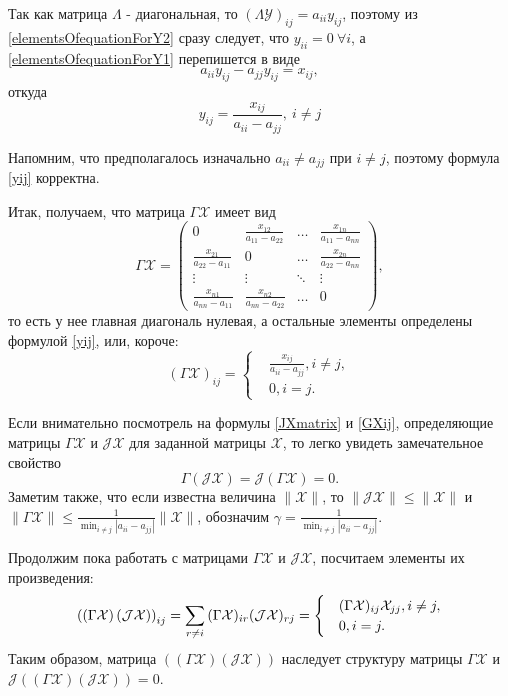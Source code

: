 Так как матрица $\Lambda$ - диагональная, то $(\Lambda\mathcal{Y})_{ij} = a_{ii}y_{ij}$, 
 поэтому из \eqref{elementsOfequationForY2} сразу следует, что $y_{ii}=0\  \forall i$, а \eqref{elementsOfequationForY1} перепишется в виде
$$
a_{ii} y_{ij}-a_{jj} y_{ij}=x_{ij},
$$
откуда 
\begin{equation}\label{yij}
y_{ij}=\frac{x_{ij}}{a_{ii}-a_{jj}},\ i \ne j 
\end{equation}

Напомним, что предполагалось изначально $a_{ii} \ne a_{jj}$ при $i \ne j$, поэтому формула \eqref{yij} корректна.

Итак, получаем, что матрица $\Gamma\mathcal{X}$ имеет вид
$$
\Gamma\mathcal{X}=
\begin{pmatrix}
             0               & \frac{x_{12}}{a_{11}-a_{22}} & \dots  & \frac{x_{1n}}{a_{11}-a_{nn}} \\
\frac{x_{21}}{a_{22}-a_{11}} &               0              & \dots  & \frac{x_{2n}}{a_{22}-a_{nn}} \\
\vdots & \vdots & \ddots & \vdots \\
\frac{x_{n1}}{a_{nn}-a_{11}} & \frac{x_{n2}}{a_{nn}-a_{22}} & \dots  &              0               
\end{pmatrix},
$$
то есть у нее главная диагональ нулевая, а остальные элементы определены формулой \eqref{yij}, или, короче:
\begin{equation}\label{GXij}
\left(\Gamma\mathcal{X}\right)_{ij}=
\begin{cases}
	&\frac{x_{ij}}{a_{ii}-a_{jj}}, i \ne j, \\
	&0, i=j.
\end{cases} 
\end{equation}


Если внимательно посмотрель на формулы \eqref{JXmatrix} и \eqref{GXij}, определяющие матрицы $\Gamma\mathcal{X}$ и $\mathcal{J}\mathcal{X}$ для заданной матрицы $\mathcal{X}$, то легко увидеть замечательное свойство 
$$
\Gamma(\mathcal{J}\mathcal{X})=\mathcal{J}(\Gamma\mathcal{X})=0.
$$
Заметим также, что если известна величина $\|\mathcal{X}\|$, то $\|\mathcal{J}\mathcal{X}\| \leq \|\mathcal{X}\|$ и \\
$\|\Gamma\mathcal{X}\| \leq \frac{1}{\min_{i \ne j}|a_{ii}-a_{jj}|} \|\mathcal{X}\|$, обозначим $\gamma = \frac{1}{\min_{i \ne j}|a_{ii}-a_{jj}|}$.

Продолжим пока работать с матрицами $\Gamma\mathcal{X}$ и $\mathcal{J}\mathcal{X}$, посчитаем элементы их произведения:
\begin{equation}
\left(\left(\Gamma\mathcal{X}\right)\left(\mathcal{J}\mathcal{X}\right)\right)_{ij}=\sum_{r \ne i}{(\Gamma\mathcal{X})_{ir}(\mathcal{J}\mathcal{X})_{rj}}=
\begin{cases}
&(\Gamma\mathcal{X})_{ij}\mathcal{X}_{jj}, i \ne j, \\
&0, i=j.
\end{cases} \notag
\end{equation}
Таким образом, матрица $\left(\left(\Gamma\mathcal{X}\right)\left(\mathcal{J}\mathcal{X}\right)\right)$ наследует структуру матрицы $\Gamma\mathcal{X}$ и \\
$\mathcal{J}\left(\left(\Gamma\mathcal{X}\right)\left(\mathcal{J}\mathcal{X}\right)\right)=0$.

